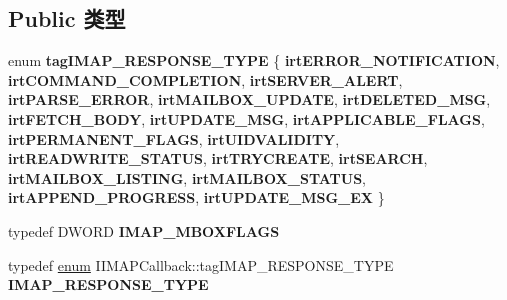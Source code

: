 \subsection*{Public 类型}
\begin{DoxyCompactItemize}
\item 
\mbox{\label{interface_i_i_m_a_p_callback_af9c30465e65ad74710fa6e75dd687136}} 
enum {\bfseries tag\+I\+M\+A\+P\+\_\+\+R\+E\+S\+P\+O\+N\+S\+E\+\_\+\+T\+Y\+PE} \{ \newline
{\bfseries irt\+E\+R\+R\+O\+R\+\_\+\+N\+O\+T\+I\+F\+I\+C\+A\+T\+I\+ON}, 
{\bfseries irt\+C\+O\+M\+M\+A\+N\+D\+\_\+\+C\+O\+M\+P\+L\+E\+T\+I\+ON}, 
{\bfseries irt\+S\+E\+R\+V\+E\+R\+\_\+\+A\+L\+E\+RT}, 
{\bfseries irt\+P\+A\+R\+S\+E\+\_\+\+E\+R\+R\+OR}, 
\newline
{\bfseries irt\+M\+A\+I\+L\+B\+O\+X\+\_\+\+U\+P\+D\+A\+TE}, 
{\bfseries irt\+D\+E\+L\+E\+T\+E\+D\+\_\+\+M\+SG}, 
{\bfseries irt\+F\+E\+T\+C\+H\+\_\+\+B\+O\+DY}, 
{\bfseries irt\+U\+P\+D\+A\+T\+E\+\_\+\+M\+SG}, 
\newline
{\bfseries irt\+A\+P\+P\+L\+I\+C\+A\+B\+L\+E\+\_\+\+F\+L\+A\+GS}, 
{\bfseries irt\+P\+E\+R\+M\+A\+N\+E\+N\+T\+\_\+\+F\+L\+A\+GS}, 
{\bfseries irt\+U\+I\+D\+V\+A\+L\+I\+D\+I\+TY}, 
{\bfseries irt\+R\+E\+A\+D\+W\+R\+I\+T\+E\+\_\+\+S\+T\+A\+T\+US}, 
\newline
{\bfseries irt\+T\+R\+Y\+C\+R\+E\+A\+TE}, 
{\bfseries irt\+S\+E\+A\+R\+CH}, 
{\bfseries irt\+M\+A\+I\+L\+B\+O\+X\+\_\+\+L\+I\+S\+T\+I\+NG}, 
{\bfseries irt\+M\+A\+I\+L\+B\+O\+X\+\_\+\+S\+T\+A\+T\+US}, 
\newline
{\bfseries irt\+A\+P\+P\+E\+N\+D\+\_\+\+P\+R\+O\+G\+R\+E\+SS}, 
{\bfseries irt\+U\+P\+D\+A\+T\+E\+\_\+\+M\+S\+G\+\_\+\+EX}
 \}
\item 
\mbox{\label{interface_i_i_m_a_p_callback_acaa49023ee10e5de49b5b537ac7bf405}} 
typedef D\+W\+O\+RD {\bfseries I\+M\+A\+P\+\_\+\+M\+B\+O\+X\+F\+L\+A\+GS}
\item 
\mbox{\label{interface_i_i_m_a_p_callback_ab18535e237724168b30b22386576a1e7}} 
typedef \hyperlink{interfaceenum}{enum} I\+I\+M\+A\+P\+Callback\+::tag\+I\+M\+A\+P\+\_\+\+R\+E\+S\+P\+O\+N\+S\+E\+\_\+\+T\+Y\+PE {\bfseries I\+M\+A\+P\+\_\+\+R\+E\+S\+P\+O\+N\+S\+E\+\_\+\+T\+Y\+PE}
\item 
\mbox{\label{interface_i_i_m_a_p_callback_a62b1c4641f0643dd0d8071bc6dca861f}} 

\end{DoxyCompactItemize}
